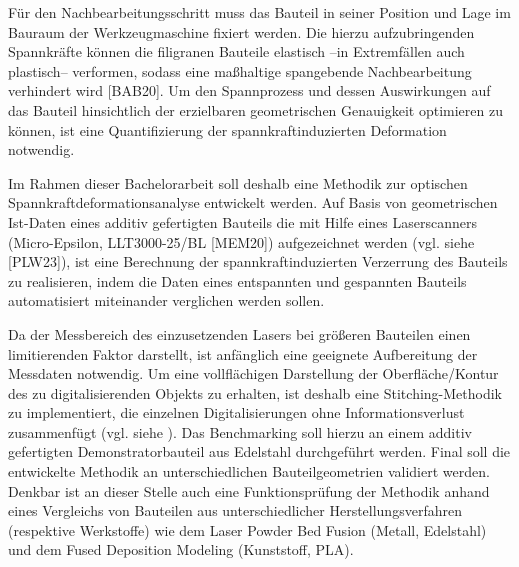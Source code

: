 \documentclass[../main.tex]{subfiles}
\begin{document}
Für den Nachbearbeitungsschritt muss das Bauteil in seiner Position und Lage im Bauraum der
Werkzeugmaschine fixiert werden. Die hierzu aufzubringenden Spannkräfte können die filigranen
Bauteile elastisch –in Extremfällen auch plastisch– verformen, sodass eine maßhaltige
spangebende Nachbearbeitung verhindert wird [BAB20]. Um den Spannprozess und dessen
Auswirkungen auf das Bauteil hinsichtlich der erzielbaren geometrischen Genauigkeit optimieren
zu können, ist eine Quantifizierung der spannkraftinduzierten Deformation notwendig.
\newline

Im Rahmen dieser Bachelorarbeit soll deshalb eine Methodik zur optischen
Spannkraftdeformationsanalyse entwickelt werden. Auf Basis von geometrischen Ist-Daten eines
additiv gefertigten Bauteils die mit Hilfe eines Laserscanners (Micro-Epsilon, LLT3000-25/BL
[MEM20]) aufgezeichnet werden (vgl. siehe [PLW23]), ist eine Berechnung der
spannkraftinduzierten Verzerrung des Bauteils zu realisieren, indem die Daten eines entspannten
und gespannten Bauteils automatisiert miteinander verglichen werden sollen.
\newline

Da der Messbereich des einzusetzenden Lasers bei größeren Bauteilen einen limitierenden Faktor
darstellt, ist anfänglich eine geeignete Aufbereitung der Messdaten notwendig. Um eine
vollflächigen Darstellung der Oberfläche/Kontur des zu digitalisierenden Objekts zu erhalten, ist
deshalb eine Stitching-Methodik zu implementiert, die einzelnen Digitalisierungen ohne
Informationsverlust zusammenfügt (vgl. siehe \cite{JADHAV20222094}). Das Benchmarking soll hierzu an einem
additiv gefertigten Demonstratorbauteil aus Edelstahl durchgeführt werden. Final soll die
entwickelte Methodik an unterschiedlichen Bauteilgeometrien validiert werden. Denkbar ist an
dieser Stelle auch eine Funktionsprüfung der Methodik anhand eines Vergleichs von Bauteilen aus
unterschiedlicher Herstellungsverfahren (respektive Werkstoffe) wie dem Laser Powder Bed
Fusion (Metall, Edelstahl) und dem Fused Deposition Modeling (Kunststoff, PLA).
\end{document}
